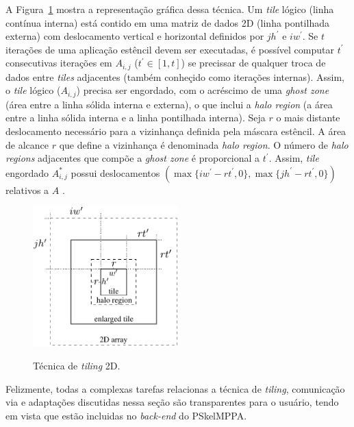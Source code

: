 A Figura~\ref{fig:gputile} mostra a representação gráfica dessa técnica. Um \emph{tile} lógico (linha contínua interna) está contido em uma matriz de dados 2D (linha pontilhada externa) com deslocamento vertical e horizontal definidos por $j h^\prime$ e $i w^\prime$. Se $t$ iterações de uma aplicação estêncil devem ser executadas, é possível computar $t^\prime$ consecutivas iterações em $A_{i,j}$ ($t^\prime \in \left[1,t\right]$) se precissar de qualquer troca de dados entre \emph{tiles} adjacentes (também conheçido como iterações internas). Assim, o \emph{tile} lógico ($A_{i,j}$) precisa ser engordado, com o acréscimo de uma \emph{ghost zone} (área entre a linha sólida interna e externa), o que inclui a \emph{halo region} (a área entre a linha sólida interna e a linha pontilhada interna). Seja $r$ o mais distante deslocamento necessário para a vizinhança definida pela máscara estêncil. A área de alcance $r$ que define a vizinhança é denominada \textit{halo region}. O número de \emph{halo regions} adjacentes que compõe a \emph{ghost zone} é proporcional a $t^\prime$.
%
Assim, \emph{tile} engordado $A^\ast_{i,j}$ possui deslocamentos $(\max\{iw^\prime - rt^\prime, 0\}, \max\{jh^\prime - rt^\prime, 0\})$ relativos a $A$ \cite{Podesta:TCC}. 

\begin{figure}
	\centering
	\caption{Técnica de \textit{tiling} 2D.}
	\includegraphics[width=0.5\textwidth]{figs/tile.pdf} \\
	\label{fig:gputile}
\end{figure}

Felizmente, todas a complexas tarefas relacionas a técnica de \textit{tiling}, comunicação via \noc e adaptações discutidas nessa seção são transparentes para o usuário, tendo em vista que estão incluidas no \emph{back-end} do PSkelMPPA.

